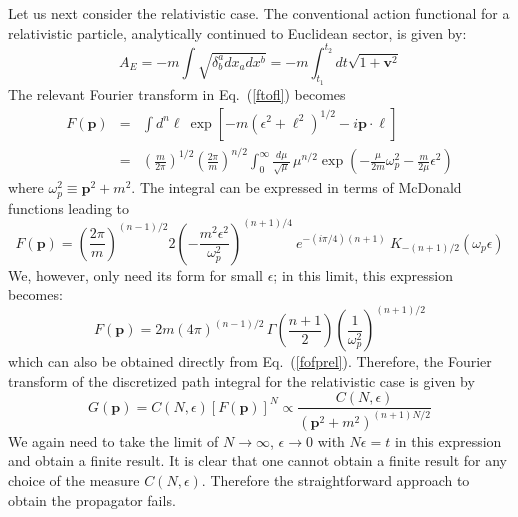 \documentclass[12pt]{article}
\def\eq#1{{Eq.~(\ref{#1})}}
\def\frab#1#2{\left(\frac{#1}{#2}\right)}
\begin{document}
Let us next consider the relativistic case. The  conventional action functional for a relativistic particle, analytically continued to Euclidean sector, is given by:
 \begin{equation}
 A_E = - m \int \sqrt{\delta^a_b dx_a dx^b}=- m \int_{t_1}^{t_2} dt \sqrt{1+\bm{v}^2}
\label{sqrtact}
\end{equation} 
The relevant Fourier transform in \eq{ftofl} becomes
\begin{eqnarray}
 F(\bm{p}) &=& \int d^n\bm{\ell}\ \exp[-m(\epsilon^2+\bm{\ell}^2)^{1/2} - i\bm{p\cdot \ell}]\nonumber\\
 &=& \frab{m}{2\pi}^{1/2}\frab{2\pi}{m}^{n/2} \int_0^\infty \frac{d\mu }{\sqrt{\mu }} \, \mu ^{n/2} \exp\left( - \frac{\mu }{2m} \omega_p^2 - \frac{m}{2\mu } \epsilon^2\right)
 \label{fofprel}
\end{eqnarray}
where $\omega_p^2 \equiv \bm{p}^2 + m^2$.
The integral can be expressed in terms of McDonald functions leading to
\begin{equation}
 F(\bm{p}) = \frab{2\pi}{m}^{(n-1)/2} 2 \left(- \frac{m^2 \epsilon^2}{\omega_p^2}\right)^{(n+1)/4} \ e^{-(i\pi/4)(n+1)} \
 K_{-(n+1)/2} (\omega_p\epsilon)
\end{equation}
We, however, only need its form for small $\epsilon$; in this limit, 
 this expression becomes:
\begin{equation}
 F(\bm{p}) = 2m (4\pi)^{(n-1)/2} \, \Gamma\frab{n+1}{2} \frab{1}{\omega_p^2}^{(n+1)/2}
 \label{fofprel1}
\end{equation}
which can also be obtained directly from \eq{fofprel}. 
Therefore, the Fourier transform of the discretized path integral for the relativistic case is given by
\begin{equation}
 G(\bm{p}) = C(N,\epsilon)\left[ F(\bm{p})\right]^{N} \propto \frac{C(N,\epsilon)}{(\bm{p}^2+m^2)^{(n+1)N/2}}
 \label{disaster1}
\end{equation} 
We again need to take the limit of $N\to \infty$, $\epsilon \to 0$ with $N\epsilon = t$  in this expression and obtain a finite result. It is clear that one cannot obtain a finite result for any choice of the measure $C(N,\epsilon)$. Therefore the straightforward approach to obtain the propagator fails. 
\end{document}
